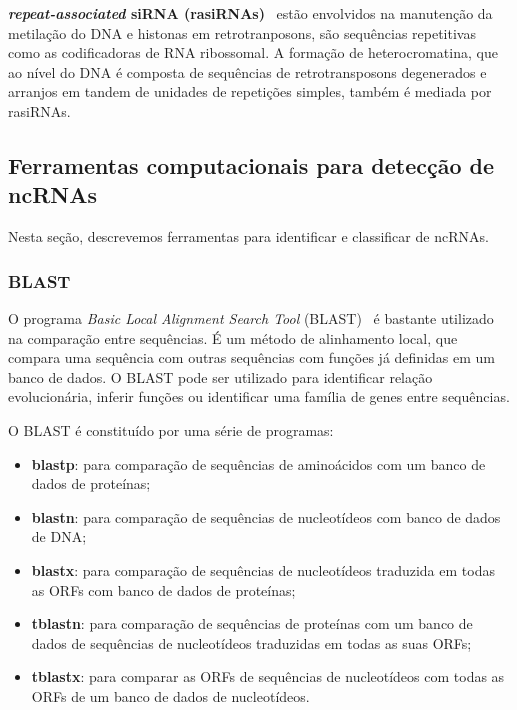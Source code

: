 \textbf{\textit{repeat-associated} siRNA (rasiRNAs)}~\citep{xie2004genetic:2004} estão envolvidos na manutenção da metilação do DNA e histonas em retrotranposons, são sequências repetitivas como as codificadoras de RNA
ribossomal. A formação de heterocromatina, que ao nível do DNA é composta de sequências de retrotransposons degenerados e arranjos em tandem de unidades de repetições simples, também é mediada por rasiRNAs.


\subsection{Ferramentas computacionais para detecção de ncRNAs} \label{sec:FerraCompDet}

Nesta seção, descrevemos ferramentas para identificar e classificar de ncRNAs.


\subsubsection*{BLAST}

O programa \textit{Basic Local Alignment Search Tool} (BLAST)~\citep{altschul1990basic:1990} é bastante utilizado na comparação entre sequências. É um método de alinhamento local, que compara uma sequência com outras sequências com funções já definidas em um banco de dados. O BLAST pode ser utilizado para identificar relação evolucionária, inferir funções ou identificar uma família de genes entre sequências.

O BLAST é constituído por uma série de programas:

\begin{itemize}
\item \textbf{blastp}: para comparação de sequências de aminoácidos com um banco de dados
de proteínas;
\item \textbf{blastn}: para comparação de sequências de nucleotídeos com banco de dados
de DNA;
\item \textbf{blastx}: para comparação de sequências de nucleotídeos traduzida em
todas as ORFs com banco de dados de proteínas;
\item \textbf{tblastn}: para comparação de sequências de proteínas com um banco de dados
de sequências de nucleotídeos traduzidas em todas as suas ORFs;
\item \textbf{tblastx}: para comparar as ORFs de sequências de nucleotídeos com todas as
ORFs de um banco de dados de nucleotídeos.
\end{itemize}

